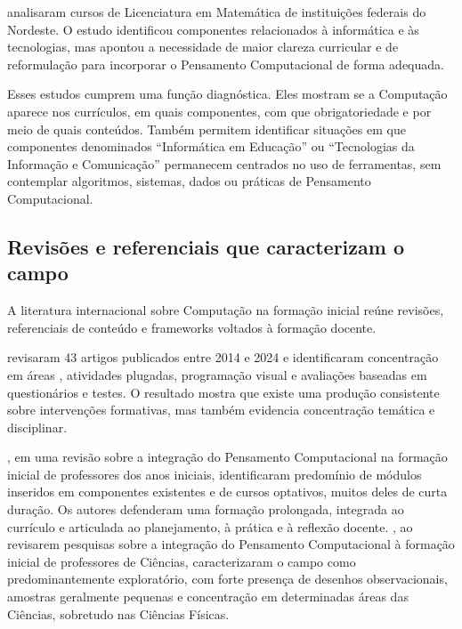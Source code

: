 analisaram cursos de Licenciatura em Matemática de instituições federais do Nordeste. O estudo identificou componentes relacionados à informática e às tecnologias, mas apontou a necessidade de maior clareza curricular e de reformulação para incorporar o Pensamento Computacional de forma adequada.

Esses estudos cumprem uma função diagnóstica. Eles mostram se a Computação aparece nos currículos, em quais componentes, com que obrigatoriedade e por meio de quais conteúdos. Também permitem identificar situações em que componentes denominados ``Informática em Educação'' ou ``Tecnologias da Informação e Comunicação'' permanecem centrados no uso de ferramentas, sem contemplar algoritmos, sistemas, dados ou práticas de Pensamento Computacional.

\subsection{Revisões e referenciais que caracterizam o campo}
\label{subsec:revisoes-referenciais-campo}

A literatura internacional sobre Computação na formação inicial reúne revisões, referenciais de conteúdo e frameworks voltados à formação docente.

 revisaram 43 artigos publicados entre 2014 e 2024 e identificaram concentração em áreas , atividades plugadas, programação visual e avaliações baseadas em questionários e testes. O resultado mostra que existe uma produção consistente sobre intervenções formativas, mas também evidencia concentração temática e disciplinar.

, em uma revisão sobre a integração do Pensamento Computacional na formação inicial de professores dos anos iniciais, identificaram predomínio de módulos inseridos em componentes existentes e de cursos optativos, muitos deles de curta duração. Os autores defenderam uma formação prolongada, integrada ao currículo e articulada ao planejamento, à prática e à reflexão docente. , ao revisarem pesquisas sobre a integração do Pensamento Computacional à formação inicial de professores de Ciências, caracterizaram o campo como predominantemente exploratório, com forte presença de desenhos observacionais, amostras geralmente pequenas e concentração em determinadas áreas das Ciências, sobretudo nas Ciências Físicas.

